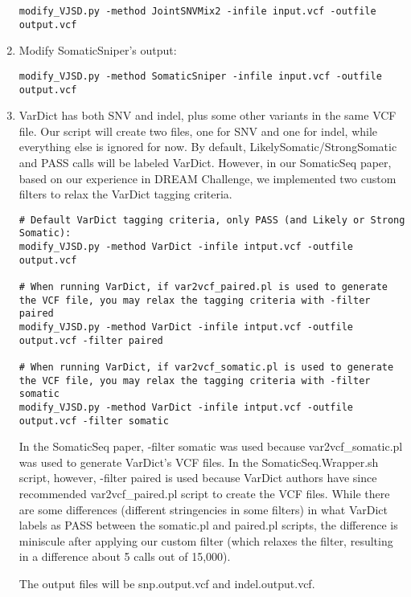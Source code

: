 \documentclass[10pt,letterpaper]{article}
\begin{document}
\begin{sloppypar}
\begin{enumerate}
\begin{lstlisting}
modify_VJSD.py -method JointSNVMix2 -infile input.vcf -outfile output.vcf
\end{lstlisting}

\item	
Modify SomaticSniper's output:
	
\begin{lstlisting}
modify_VJSD.py -method SomaticSniper -infile input.vcf -outfile output.vcf
\end{lstlisting}
	
	
\item	
VarDict has both SNV and indel, plus some other variants in the same VCF file. Our script will create two files, one for SNV and one for indel, while everything else is ignored for now. By default, LikelySomatic/StrongSomatic and PASS calls will be labeled VarDict. However, in our SomaticSeq paper, based on our experience in DREAM Challenge, we implemented two custom filters to relax the VarDict tagging criteria. 
	
\begin{lstlisting}
# Default VarDict tagging criteria, only PASS (and Likely or Strong Somatic):
modify_VJSD.py -method VarDict -infile intput.vcf -outfile output.vcf
	
# When running VarDict, if var2vcf_paired.pl is used to generate the VCF file, you may relax the tagging criteria with -filter paired
modify_VJSD.py -method VarDict -infile intput.vcf -outfile output.vcf -filter paired
	
# When running VarDict, if var2vcf_somatic.pl is used to generate the VCF file, you may relax the tagging criteria with -filter somatic
modify_VJSD.py -method VarDict -infile intput.vcf -outfile output.vcf -filter somatic
\end{lstlisting}
	

In the SomaticSeq paper, -filter somatic was used because var2vcf\_somatic.pl was used to generate VarDict's VCF files. In the SomaticSeq.Wrapper.sh script, however, -filter paired is used because VarDict authors have since recommended var2vcf\_paired.pl script to create the VCF files. While there are some differences (different stringencies in some filters) in what VarDict labels as PASS between the somatic.pl and paired.pl scripts, the difference is miniscule after applying our custom filter (which relaxes the filter, resulting in a difference about 5 calls out of 15,000). 

The output files will be snp.output.vcf and indel.output.vcf. 



\end{enumerate}
\end{sloppypar}
\end{document}
